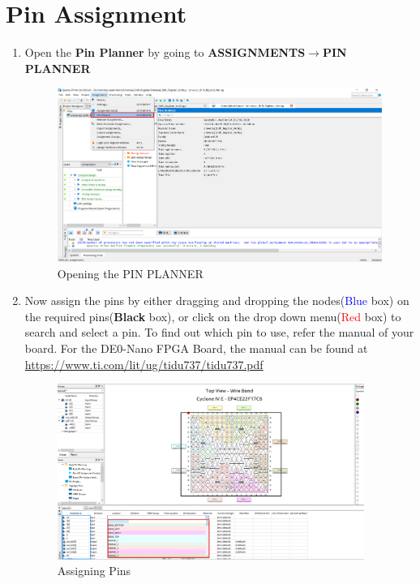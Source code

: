 \documentclass[12pt]{article}
\begin{document}
\section{Pin Assignment}
\begin{enumerate}
    \item Open the \textbf{Pin Planner} by going to \textbf{ASSIGNMENTS$\rightarrow$PIN PLANNER}
    \begin{figure}[H]
        \centering
        \includegraphics[width=14cm,keepaspectratio]{usr7.png}
        \caption{Opening the PIN PLANNER}
    \end{figure}
    \newpage
    \item Now assign the pins by either dragging and dropping the nodes(\textcolor{blue}{Blue} box) on the required pins(\textbf{Black} box), or click on the drop down menu(\textcolor{red}{Red} box) to search and select a pin. To find out which pin to use, refer the manual of your board. For the DE0-Nano FPGA Board, the manual can be found at \url{https://www.ti.com/lit/ug/tidu737/tidu737.pdf}
     \begin{figure}[H]
        \centering
        \includegraphics[width=10cm,keepaspectratio]{pin_planner/2.png}
        \caption{Assigning Pins}
    \end{figure}
    

\end{enumerate}
\end{document}
